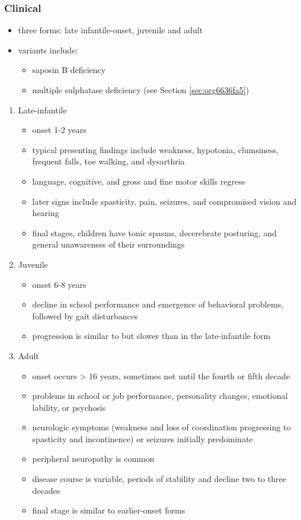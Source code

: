 \documentclass[12pt]{scrartcl}
\begin{document}
\subsubsection{Clinical}
\label{sec:org3e290c4}
\begin{itemize}
\item three forms: late infantile-onset, juvenile and adult
\item variants include:
\begin{itemize}
\item saposin B deficiency
\item multiple sulphatase deficiency (see Section \ref{sec:org6636fa5})
\end{itemize}
\end{itemize}
\begin{enumerate}
\item Late-infantile
\label{sec:org07ebe55}
\begin{itemize}
\item onset 1-2 years
\item typical presenting findings include weakness, hypotonia, clumsiness, frequent falls, toe walking, and dysarthria
\item language, cognitive, and gross and fine motor skills regress
\item later signs include spasticity, pain, seizures, and compromised vision and hearing
\item final stages, children have tonic spasms, decerebrate posturing, and
general unawareness of their surroundings
\end{itemize}

\item Juvenile
\label{sec:org6fc4dd0}
\begin{itemize}
\item onset 6-8 years
\item decline in school performance and emergence of behavioral problems, followed by gait disturbances
\item progression is similar to but slower than in the late-infantile form
\end{itemize}

\item Adult
\label{sec:org63c0980}
\begin{itemize}
\item onset occurs \textgreater{} 16 years, sometimes not until the fourth or fifth decade
\item problems in school or job performance, personality changes, emotional lability, or psychosis
\item neurologic symptoms (weakness and loss of coordination progressing
to spasticity and incontinence) or seizures initially
predominate
\item peripheral neuropathy is common
\item disease course is variable, periods of stability and decline two to three decades
\item final stage is similar to earlier-onset forms
\end{itemize}
\end{enumerate}
\end{document}
